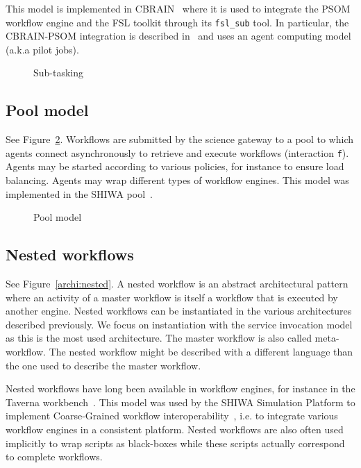 \documentclass[preprint,3p,twocolumn]{elsarticle}
\begin{document}
This model is implemented in CBRAIN~\cite{SHER-14} where it is used to
integrate the PSOM workflow engine and the FSL toolkit through its
\texttt{fsl\_sub} tool. In particular, the CBRAIN-PSOM integration is
described in~\cite{GLAT-16} and uses an agent computing model (a.k.a pilot
jobs).
\begin{figure}
\centering
\def\svgwidth{0.5\columnwidth}

\caption{Sub-tasking}
\label{archi:sub-task}
\end{figure}

\subsection{Pool model}
\label{sec:pool}
See Figure~\ref{archi:agent}. Workflows are submitted by the science
gateway to a pool to which agents connect asynchronously to retrieve
and execute workflows (interaction \texttt{f}). Agents may be started according to various
policies, for instance to ensure load balancing. Agents may wrap
different types of workflow engines. This model was implemented in the
SHIWA pool~\cite{ROGE-13}.
\begin{figure}
\centering
\def\svgwidth{0.8\columnwidth}

\caption{Pool model}
\label{archi:agent}
\end{figure}

\subsection{Nested workflows}

See Figure~\ref{archi:nested}. A nested workflow is an abstract
architectural pattern where an activity of a master workflow is itself
a workflow that is executed by another engine. Nested workflows can be
instantiated in the various architectures described previously. We
focus on instantiation with the service invocation model as this is
the most used architecture. The master workflow is also called
meta-workflow. The nested workflow might be described with a different
language than the one used to describe the master workflow.

Nested workflows have long been available in workflow engines, for
instance in the Taverna workbench~\cite{oinn2004taverna}. This model
was used by the SHIWA Simulation Platform to implement Coarse-Grained
workflow interoperability~\cite{terstyanszky2014enabling}, i.e. to
integrate various workflow engines in a consistent platform. Nested
workflows are also often used implicitly to wrap scripts as
black-boxes while these scripts actually correspond to complete workflows.
\end{document}
